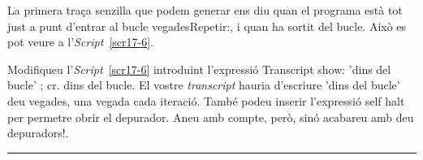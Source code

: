 La primera traça senzilla que podem generar ens diu quan el programa està tot just a punt d'entrar al bucle \textsf{vegadesRepetir:}, i quan ha sortit del bucle. Això es pot veure a l'\emph{Script}~\ref{scr17-6}.

 \begin{center}
\colorbox{black}{}
\end{center}
{\small
\noindent
Modifiqueu l'\emph{Script}~\ref{scr17-6} introduint l'expressió \textsf{Transcript show: 'dins del bucle' ; cr.} dins del bucle. El vostre \emph{transcript} hauria d'escriure \textsf{'dins del bucle'} deu vegades, una vegada cada iteració. També podeu inserir l'expressió \textsf{self halt} per permetre obrir el depurador. Aneu amb compte, però, sinó acabareu amb deu depuradors!.}\\
\noindent
\rule{\textwidth}{3pt}
\vspace*{2mm}


